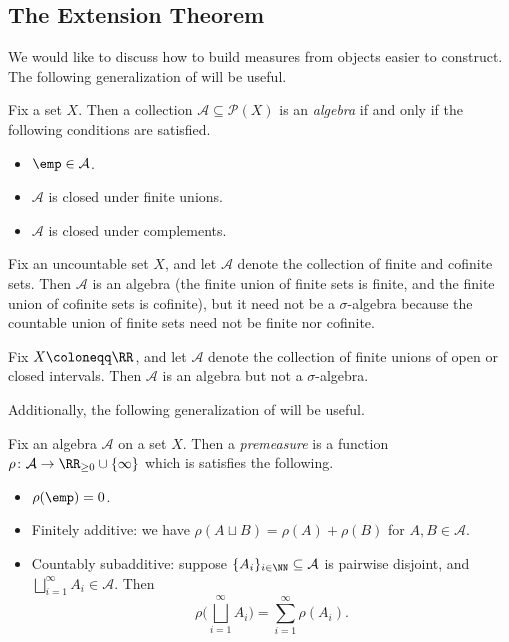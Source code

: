 \documentclass[../notes.tex]{subfiles}
\begin{document}
\subsection{The Extension Theorem}
We would like to discuss how to build measures from objects easier to construct. The following generalization of  will be useful.
\begin{definition}[algebra]
	Fix a set $X$. Then a collection $\mathcal A\subseteq\mathcal P(X)$ is an \textit{algebra} if and only if the following conditions are satisfied.
	\begin{itemize}
		\item $\emp\in\mathcal A$.
		\item $\mathcal A$ is closed under finite unions.
		\item $\mathcal A$ is closed under complements.
	\end{itemize}
\end{definition}
\begin{example}
	Fix an uncountable set $X$, and let $\mathcal A$ denote the collection of finite and cofinite sets. Then $\mathcal A$ is an algebra (the finite union of finite sets is finite, and the finite union of cofinite sets is cofinite), but it need not be a $\sigma$-algebra because the countable union of finite sets need not be finite nor cofinite.
\end{example}
\begin{example}
	Fix $X\coloneqq\RR$, and let $\mathcal A$ denote the collection of finite unions of open or closed intervals. Then $\mathcal A$ is an algebra but not a $\sigma$-algebra.
\end{example}
Additionally, the following generalization of  will be useful.
\begin{definition}[premeasure]
	Fix an algebra $\mathcal A$ on a set $X$. Then a \textit{premeasure} is a function $\rho\colon\mathcal A\to\RR_{\ge0}\cup\{\infty\}$ which is satisfies the following.
	\begin{itemize}
		\item $\rho(\emp)=0$.
		\item Finitely additive: we have $\rho(A\sqcup B)=\rho(A)+\rho(B)$ for $A,B\in\mathcal A$.
		\item Countably subadditive: suppose $\{A_i\}_{i\in\NN}\subseteq\mathcal A$ is pairwise disjoint, and $\bigsqcup_{i=1}^\infty A_i\in\mathcal A$. Then
		\[\rho\Bigg(\bigsqcup_{i=1}^\infty A_i\Bigg)=\sum_{i=1}^\infty\rho(A_i).\]
	\end{itemize}
\end{definition}
\end{document}

